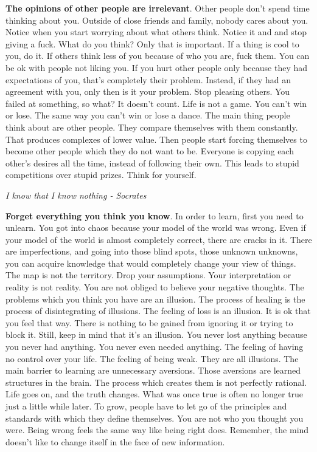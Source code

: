 \documentclass[a4paper,hidelinks]{article}
\begin{document}
\textbf{The opinions of other people are irrelevant}.
Other people don't spend time thinking about you.
Outside of close friends and family, nobody cares about you.
Notice when you start worrying about what others think.
Notice it and and stop giving a fuck.
What do you think?
Only that is important.
If a thing is cool to you, do it.
If others think less of you because of who you are, fuck them.
You can be ok with people not liking you.
If you hurt other people only because they had expectations of you, that's completely their problem.
Instead, if they had an agreement with you, only then is it your problem.
Stop pleasing others.
You failed at something, so what?
It doesn't count.
Life is not a game.
You can't win or lose.
The same way you can't win or lose a dance.
The main thing people think about are other people.
They compare themselves with them constantly.
That produces complexes of lower value.
Then people start forcing themselves to become other people which they do not want to be.
Everyone is copying each other's desires all the time, instead of following their own.
This leads to stupid competitions over stupid prizes.
Think for yourself.

\newpage

\begin{center}
\textit{
I know that I know nothing - Socrates
}
\end{center}

\textbf{Forget everything you think you know}.
In order to learn, first you need to unlearn.
You got into chaos because your model of the world was wrong.
Even if your model of the world is almost completely correct, there are cracks in it.
There are imperfections, and going into those blind spots, those unknown unknowns, you can acquire knowledge that would completely change your view of things.
The map is not the territory.
Drop your assumptions.
Your interpretation or reality is not reality.
You are not obliged to believe your negative thoughts.
The problems which you think you have are an illusion.
The process of healing is the process of disintegrating of illusions.
The feeling of loss is an illusion.
It is ok that you feel that way.
There is nothing to be gained from ignoring it or trying to block it.
Still, keep in mind that it's an illusion.
You never lost anything because you never had anything.
You never even needed anything.
The feeling of having no control over your life.
The feeling of being weak.
They are all illusions.
The main barrier to learning are unnecessary aversions.
Those aversions are learned structures in the brain.
The process which creates them is not perfectly rational.
Life goes on, and the truth changes.
What was once true is often no longer true just a little while later.
To grow, people have to let go of the principles and standards with which they define themselves.
You are not who you thought you were.
Being wrong feels the same way like being right does.
Remember, the mind doesn't like to change itself in the face of new information.
\end{document}

